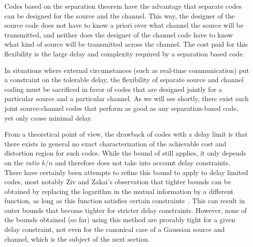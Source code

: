 Codes based on the separation theorem have the advantage that separate codes can
be designed for the source and the channel. This way, the designer of the source
code does not have to know a priori over what channel the source will be
transmitted, and neither does the designer of the channel code have to know what
kind of source will be transmitted across the channel. The cost paid for this
flexibility is the large delay and complexity required by a separation based
code. 

In situations where external circumstances (such as real-time communication) put
a constraint on the tolerable delay, the flexibility of separate source and
channel coding must be sacrificed in favor of codes that are designed jointly
for a particular source and a particular channel. As we will see shortly, there
exist such joint source-channel codes that perform as good as any
separation-based code, yet only cause minimal delay.

%
From a theoretical point of view, the drawback of codes with a delay limit is
that there exists in general no exact characterization of the achievable cost
and distortion region for such codes. While the bound of
 still applies, it only depends on the \emph{ratio}
$k/n$ and therefore does not take into account delay constraints. There have
certainly been attempts to refine this bound to apply to delay limited codes,
most notably Ziv and Zakai's observation that tighter bounds can be obtained by
replacing the logarithm in the mutual information by a different function, as
long as this function satisfies certain constraints~\cite{ZivZ1973}. This can
result in outer bounds that become tighter for stricter delay constraints.
However, none of the bounds obtained (so far) using this method are provably
tight for a given delay constraint, not even for the canonical case of a
Gaussian source and channel, which is the subject of the next section.

